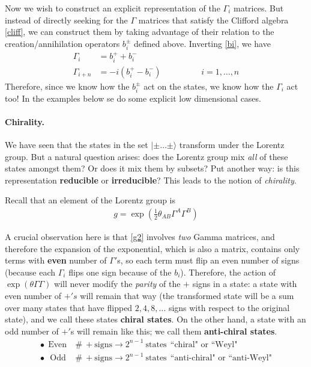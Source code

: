 \documentclass[a4paper,12pt]{article}
\numberwithin{equation}{section}
\numberwithin{exe}{section}
\newcommand{\G}{{\Gamma}}
\newcommand{\ket}[1]{| #1 \rangle}
\begin{document}
Now we wish to construct an explicit representation of the $\G_i$ matrices. But instead of directly seeking for the $\G$ matrices that satisfy the Clifford algebra \eqref{cliff}, we can construct them by taking advantage of their relation to the creation/annihilation operators $b_i^\pm$ defined above. Inverting \eqref{bi}, we have  
	\begin{align}
	\G_i &=  b_i^+ + b_i^- \nonumber  \\
	\G_{i+n} &= -i\left( b_i^+ - b_i^- \right)   \hspace{2cm}i=1,\hdots, n \label{ladder}
	\end{align}
Therefore, since we know how the $b_i^\pm$ act on the states, we know how the $\G_i$ act too! In the examples below se do some explicit low dimensional cases.

\paragraph{Chirality.} \label{chirality}
We have seen that the states in the set $\ket{\pm\hdots \pm}$ transform under the Lorentz group. But a natural question arises: does the Lorentz group mix \textit{all} of these states amongst them? Or does it mix them by subsets? Put another way: is this representation \textbf{reducible} or \textbf{irreducible}? This leads to the notion of \textit{chirality}.

Recall that an element of the Lorentz group is 
	\begin{align}\label{g2}
	g=\exp \left( \frac{1}{2}\theta_{AB} \G^A\G^B \right)
	\end{align}

A crucial observation here is that \eqref{g2} involves \textit{two} Gamma matrices, and therefore the expansion of the exponential, which is also a matrix, contains only terms with \textbf{even} number of $\G'$s, so each term must flip an even number of signs (because each $\G_i$ flips one sign because of the $b_i$). Therefore, the action of $\exp \left( \theta \G \G \right)$ will never modify the \textit{parity} of the $+$ signs in a state: a state with even number of $+'s$ will remain that way (the transformed state will be a sum over many states that have flipped $2,4,8,\hdots$ signs with respect to the original state), and we call these states \textbf{chiral states}. On the other hand, a state with an odd number of $+'$s will remain like this; we call them \textbf{anti-chiral states}. 
	\begin{align}\label{}
	\bullet\ \ \mbox{Even}\ &\#\ + \mbox{signs} \rightarrow 2^{n-1}\ \mbox{states}\ \ \mbox{``chiral" or ``Weyl"}\\
	\bullet\ \ \ \mbox{Odd}\ &\#\ + \mbox{signs} \rightarrow 2^{n-1}\ \mbox{states}\ \ \mbox{``anti-chiral" or ``anti-Weyl"}
	\end{align}
\end{document}
